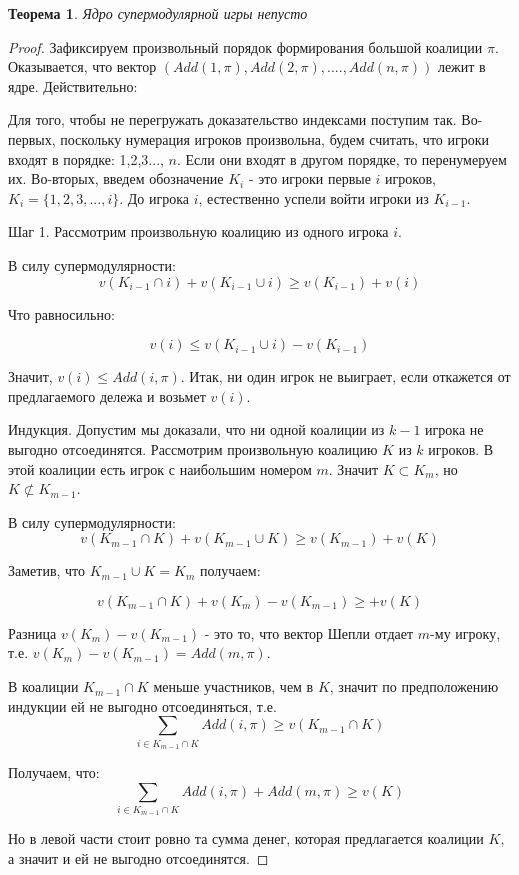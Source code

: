 \documentclass[pdftex,12pt,a4paper]{article}
\numberwithin{equation}{page} %
\newtheorem{theorem}[equation]{Теорема} %
\theoremstyle{definition} %
\theoremstyle{definition}
\theoremstyle{definition}
\begin{document}
\begin{theorem}
Ядро супермодулярной игры непусто
\end{theorem}
\begin{proof}

Зафиксируем произвольный порядок формирования большой коалиции $\pi$. Оказывается, что вектор $(Add(1,\pi),Add(2,\pi),....,Add(n,\pi))$ лежит в ядре. Действительно:

Для того, чтобы не перегружать доказательство индексами поступим так. Во-первых, поскольку нумерация игроков произвольна, будем считать, что игроки входят в порядке: 1,2,3..., $n$. Если они входят в другом порядке, то перенумеруем их. Во-вторых, введем обозначение $K_{i}$ - это игроки первые $i$ игроков, $K_{i}=\{1,2,3,...,i\}$. До игрока $i$, естественно успели войти игроки из $K_{i-1}$.

Шаг 1. Рассмотрим произвольную коалицию из одного игрока $i$.

В силу супермодулярности: 
\begin{equation}
v(K_{i-1}\cap i)+v(K_{i-1}\cup i)\geq v(K_{i-1})+v(i) 
\end{equation}

Что равносильно: 

\begin{equation}
v(i)\leq v(K_{i-1}\cup i)-v(K_{i-1})
\end{equation}

Значит, $v(i)\leq Add(i,\pi)$.
Итак, ни один игрок не выиграет, если откажется от предлагаемого дележа и возьмет $v(i)$.

Индукция. Допустим мы доказали, что ни одной коалиции из $k-1$ игрока не выгодно отсоединятся. Рассмотрим произвольную коалицию $K$ из $k$ игроков. В этой коалиции есть игрок с наибольшим номером $m$. Значит $K\subset K_{m}$, но $K\not \subset K_{m-1}$. 

В силу супермодулярности:
\begin{equation}
v(K_{m-1}\cap K)+v(K_{m-1}\cup K)\geq v(K_{m-1})+v(K) 
\end{equation}

Заметив, что $K_{m-1}\cup K=K_{m}$ получаем:

\begin{equation}
v(K_{m-1}\cap K)+v(K_{m})-v(K_{m-1})\geq +v(K) 
\end{equation}

Разница $v(K_{m})-v(K_{m-1})$ - это то, что вектор Шепли отдает $m$-му игроку, т.е. $v(K_{m})-v(K_{m-1})=Add(m,\pi)$.

В коалиции $K_{m-1}\cap K$ меньше участников, чем в $K$, значит по предположению индукции ей не выгодно отсоединяться, т.е.
\begin{equation}
\sum_{i\in K_{m-1}\cap K}Add(i,\pi)\geq v(K_{m-1}\cap K)
\end{equation}

Получаем, что:
\begin{equation}
\sum_{i\in K_{m-1}\cap K}Add(i,\pi) + Add(m,\pi)\geq v(K)
\end{equation}

Но в левой части стоит ровно та сумма денег, которая предлагается коалиции $K$, а значит и ей не выгодно отсоединятся.
\end{proof}
\end{document}
